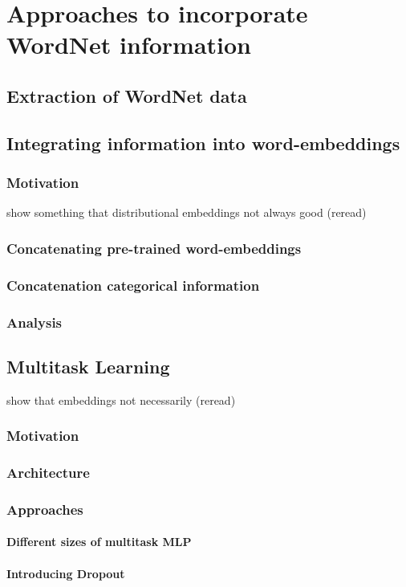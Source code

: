 \section{Approaches to incorporate WordNet information}
\subsection{Extraction of WordNet data}
\subsection{Integrating information into word-embeddings}
\subsubsection{Motivation}
\citep{rubinstein2015well} show something that distributional embeddings not always good (reread)
\subsubsection{Concatenating pre-trained word-embeddings}
\subsubsection{Concatenation categorical information}
\subsubsection{Analysis}
\subsection{Multitask Learning}
\citep{levy2015improving} show that embeddings not necessarily (reread)
\subsubsection{Motivation}
\subsubsection{Architecture}
\subsubsection{Approaches}
\paragraph{Different sizes of multitask MLP}
\paragraph{Introducing Dropout}
